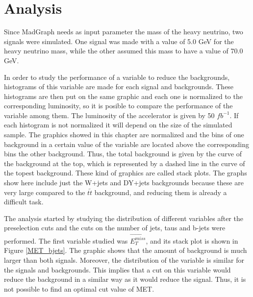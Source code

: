 \chapter{Analysis}
\label{Analysis_chapter}

Since MadGraph needs as input parameter the mass of the heavy neutrino, two signals were simulated. One signal was made with a value of 5.0 GeV for the heavy neutrino mass, while the other assumed this mass to have a value of 70.0 GeV. 

In order to study the performance of a variable to reduce the backgrounds, histograms of this variable are made for each signal and backgrounds. These histograms are then put on the same graphic and each one is normalized to the corresponding luminosity, so it is posible to compare the performance of the variable among them. The luminosity of the accelerator is given by 50 $fb^{-1}$. If each histogram is not normalized it will depend on the size of the simulated sample. The graphics showed in this chapter are normalized and the bins of one background in a certain value of the variable are located above the corresponding bins the other background. Thus, the total background is given by the curve of the background at the top, which is represented by a dashed line in the curve of the topest background. These kind of graphics are called stack plots. The graphs show here include just the W+jets and DY+jets backgrounds because these are very large compared to the $t\overleftarrow{t}$ background, and reducing them is already a difficult task.

The analysis started by studying the distribution of different variables after the preselection cuts and the cuts on the number of jets, taus and b-jets were performed. The first variable studied was $\vec{E_T^{miss}}$, and its stack plot is shown in Figure \ref{MET_bjets}. The graphic shows that the amount of background is much larger than both signals. Moreover, the distribution of the variable is similar for the signals and backgrounds. This implies that a cut on this variable would reduce the background in a similar way as it would reduce the signal. Thus, it is not possible to find an optimal cut value of MET.

